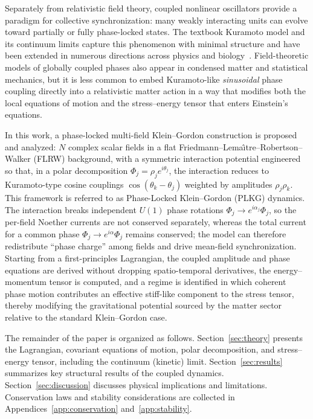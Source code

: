 Separately from relativistic field theory, coupled nonlinear oscillators provide a paradigm for collective synchronization: many weakly interacting units can evolve toward partially or fully phase-locked states.
The textbook Kuramoto model and its continuum limits capture this phenomenon with minimal structure and have been extended in numerous directions across physics and biology~\cite{Kuramoto1984,Strogatz2000,Acebron2005}.
Field-theoretic models of globally coupled phases also appear in condensed matter and statistical mechanics, but it is less common to embed Kuramoto-like \emph{sinusoidal} phase coupling directly into a relativistic matter action in a way that modifies both the local equations of motion and the stress--energy tensor that enters Einstein's equations.

In this work, a phase-locked multi-field Klein--Gordon construction is proposed and analyzed: $N$ complex scalar fields in a flat Friedmann--Lema\^{\i}tre--Robertson--Walker (FLRW) background, with a symmetric interaction potential engineered so that, in a polar decomposition $\Phi_j = \rho_j e^{i\theta_j}$, the interaction reduces to Kuramoto-type cosine couplings $\cos(\theta_k-\theta_j)$ weighted by amplitudes $\rho_j\rho_k$.
This framework is referred to as Phase-Locked Klein--Gordon (PLKG) dynamics.
The interaction breaks independent $U(1)$ phase rotations $\Phi_j \to e^{i\alpha_j}\Phi_j$, so the per-field Noether currents are not conserved separately, whereas the total current for a common phase $\Phi_j \to e^{i\alpha}\Phi_j$ remains conserved; the model can therefore redistribute ``phase charge'' among fields and drive mean-field synchronization.
Starting from a first-principles Lagrangian, the coupled amplitude and phase equations are derived without dropping spatio-temporal derivatives, the energy--momentum tensor is computed, and a regime is identified in which coherent phase motion contributes an effective stiff-like component to the stress tensor, thereby modifying the gravitational potential sourced by the matter sector relative to the standard Klein--Gordon case.

The remainder of the paper is organized as follows.
Section~\ref{sec:theory} presents the Lagrangian, covariant equations of motion, polar decomposition, and stress--energy tensor, including the continuum (kinetic) limit.
Section~\ref{sec:results} summarizes key structural results of the coupled dynamics.
Section~\ref{sec:discussion} discusses physical implications and limitations.
Conservation laws and stability considerations are collected in Appendices~\ref{app:conservation} and~\ref{app:stability}.
